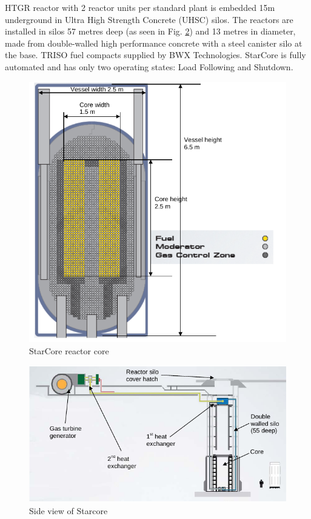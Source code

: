 \documentclass[10pt,a4paper]{article}
\begin{document}
HTGR reactor with 2 reactor units per standard plant is embedded 15m underground in Ultra High Strength Concrete (UHSC) silos. The reactors are installed in silos 57 metres deep (as seen in Fig. \ref{Starview}) and 13 metres in diameter, made from double-walled high performance concrete with a steel canister silo at the base.  TRISO fuel compacts supplied by BWX Technologies. StarCore is fully automated and has only two operating states: Load Following and Shutdown.

\begin{figure}[htbp]
\centering
\includegraphics[scale=0.5]{Figs/starcorereactor.jpeg}
\caption{StarCore reactor core}
\label{Starcore}
\end{figure}

\begin{figure}[htbp]
\centering
\includegraphics[scale=0.7]{Figs/starcoreview.jpeg}
\caption{Side view of Starcore}
\label{Starview}
\end{figure}
\end{document}
